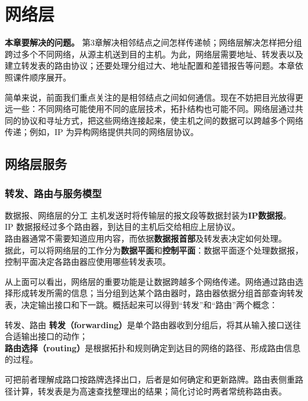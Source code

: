 \chapter{网络层}
\noindent\textbf{本章要解决的问题。} 第3章解决相邻结点之间怎样传递帧；网络层解决怎样把分组跨过多个不同网络，从源主机送到目的主机。为此，网络层需要地址、转发表以及建立转发表的路由协议；还要处理分组过大、地址配置和差错报告等问题。本章依照课件顺序展开。

简单来说，前面我们重点关注的是相邻结点之间如何通信。现在不妨把目光放得更远一些：不同网络可能使用不同的底层技术，拓扑结构也可能不同。网络层通过共同的协议和寻址方式，把这些网络连接起来，使主机之间的数据可以跨越多个网络传递；例如，IP 为异构网络提供共同的网络层协议。

\section{网络层服务}
\subsection{转发、路由与服务模型}
\begin{proposition}{数据报、网络层的分工}
主机发送时将传输层的报文段等数据封装为\textbf{IP数据报}。\\
IP 数据报经过多个路由器，到达目的主机后交给相应上层协议。\\
路由器通常不需要知道应用内容，而依据\textbf{数据报首部}及转发表决定如何处理。\\
据此，可以将网络层的工作分为\textbf{数据平面}和\textbf{控制平面}：数据平面逐个处理数据报，控制平面决定各路由器应使用哪些转发表项。
\end{proposition}

从上面可以看出，网络层的重要功能是让数据跨越多个网络传递。网络通过路由选择形成转发所需的信息；当分组到达某个路由器时，路由器依据分组首部查询转发表，决定输出接口和下一跳。概括起来可以得到“转发”和“路由”两个概念：

\begin{definition}{转发、路由}
\textbf{转发（forwarding）}是单个路由器收到分组后，将其从输入接口送往合适输出接口的动作；\\ 
\textbf{路由选择（routing）}是根据拓扑和规则确定到达目的网络的路径、形成路由信息的过程。
\end{definition}

\begin{remark}
可把前者理解成路口按路牌选择出口，后者是如何确定和更新路牌。路由表侧重路径计算，转发表是为高速查找整理出的结果；简化讨论时两者常统称路由表。
\end{remark}

